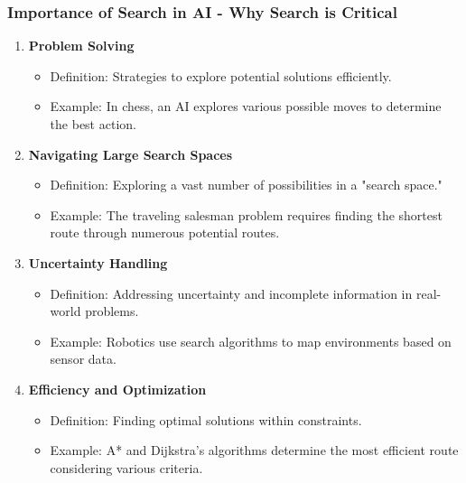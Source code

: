 \documentclass[aspectratio=169]{beamer}
\begin{document}
\begin{frame}[fragile]
    \frametitle{Importance of Search in AI - Why Search is Critical}
    \begin{enumerate}
        \item \textbf{Problem Solving}
        \begin{itemize}
            \item Definition: Strategies to explore potential solutions efficiently.
            \item Example: In chess, an AI explores various possible moves to determine the best action.
        \end{itemize}
        
        \item \textbf{Navigating Large Search Spaces}
        \begin{itemize}
            \item Definition: Exploring a vast number of possibilities in a "search space."
            \item Example: The traveling salesman problem requires finding the shortest route through numerous potential routes.
        \end{itemize}
        
        \item \textbf{Uncertainty Handling}
        \begin{itemize}
            \item Definition: Addressing uncertainty and incomplete information in real-world problems.
            \item Example: Robotics use search algorithms to map environments based on sensor data.
        \end{itemize}
        
        \item \textbf{Efficiency and Optimization}
        \begin{itemize}
            \item Definition: Finding optimal solutions within constraints.
            \item Example: A* and Dijkstra's algorithms determine the most efficient route considering various criteria.
        \end{itemize}
    \end{enumerate}
\end{frame}
\end{document}
